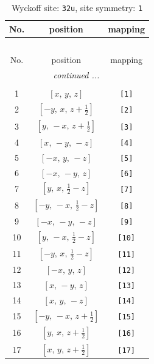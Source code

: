 \documentclass[fleqn,8pt]{jsarticle}
\begin{document}
\renewcommand{\arraystretch}{1.2}
\begin{longtable}{ccc}
\caption{Wyckoff site: {\tt 32u}, site symmetry: {\tt 1}}
 \\
 \hline \hline
No. & position & mapping \\ \hline \endfirsthead

\multicolumn{2}{l}{\tablename\ \thetable{}} \\
 \hline \hline
No. & position & mapping \\ \hline \endhead

 \hline \hline
\multicolumn{2}{r}{\footnotesize\it continued ...} \\ \endfoot

 \hline \hline
\multicolumn{2}{r}{} \\ \endlastfoot

1 & $\left[ x,\, y,\, z \right]$ & {\tt [1]} \\ \hline
2 & $\left[ - y,\, x,\, z + \frac{1}{2} \right]$ & {\tt [2]} \\ \hline
3 & $\left[ y,\, - x,\, z + \frac{1}{2} \right]$ & {\tt [3]} \\ \hline
4 & $\left[ x,\, - y,\, - z \right]$ & {\tt [4]} \\ \hline
5 & $\left[ - x,\, y,\, - z \right]$ & {\tt [5]} \\ \hline
6 & $\left[ - x,\, - y,\, z \right]$ & {\tt [6]} \\ \hline
7 & $\left[ y,\, x,\, \frac{1}{2} - z \right]$ & {\tt [7]} \\ \hline
8 & $\left[ - y,\, - x,\, \frac{1}{2} - z \right]$ & {\tt [8]} \\ \hline
9 & $\left[ - x,\, - y,\, - z \right]$ & {\tt [9]} \\ \hline
10 & $\left[ y,\, - x,\, \frac{1}{2} - z \right]$ & {\tt [10]} \\ \hline
11 & $\left[ - y,\, x,\, \frac{1}{2} - z \right]$ & {\tt [11]} \\ \hline
12 & $\left[ - x,\, y,\, z \right]$ & {\tt [12]} \\ \hline
13 & $\left[ x,\, - y,\, z \right]$ & {\tt [13]} \\ \hline
14 & $\left[ x,\, y,\, - z \right]$ & {\tt [14]} \\ \hline
15 & $\left[ - y,\, - x,\, z + \frac{1}{2} \right]$ & {\tt [15]} \\ \hline
16 & $\left[ y,\, x,\, z + \frac{1}{2} \right]$ & {\tt [16]} \\ \hline
17 & $\left[ x,\, y,\, z + \frac{1}{2} \right]$ & {\tt [17]} \\ \hline

\end{longtable}
\end{document}
